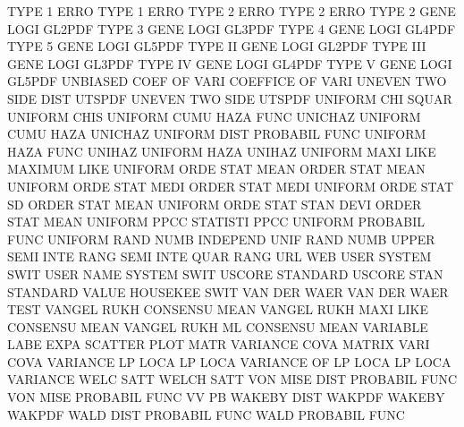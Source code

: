 TYPE     1    ERRO                      TYPE     1    ERRO
TYPE     2    ERRO                      TYPE     2    ERRO
TYPE     2    GENE LOGI                 GL2PDF
TYPE     3    GENE LOGI                 GL3PDF
TYPE     4    GENE LOGI                 GL4PDF
TYPE     5    GENE LOGI                 GL5PDF
TYPE     II   GENE LOGI                 GL2PDF
TYPE     III  GENE LOGI                 GL3PDF
TYPE     IV   GENE LOGI                 GL4PDF
TYPE     V    GENE LOGI                 GL5PDF
UNBIASED COEF OF   VARI                 COEFFICE OF   VARI
UNEVEN   TWO  SIDE DIST                 UTSPDF
UNEVEN   TWO  SIDE                      UTSPDF
UNIFORM  CHI  SQUAR                     UNIFORM  CHIS
UNIFORM  CUMU HAZA FUNC                 UNICHAZ
UNIFORM  CUMU HAZA                      UNICHAZ
UNIFORM  DIST                           PROBABIL FUNC
UNIFORM  HAZA FUNC                      UNIHAZ
UNIFORM  HAZA                           UNIHAZ
UNIFORM  MAXI LIKE                      MAXIMUM  LIKE
UNIFORM  ORDE STAT MEAN                 ORDER    STAT MEAN
UNIFORM  ORDE STAT MEDI                 ORDER    STAT MEDI
UNIFORM  ORDE STAT SD                   ORDER    STAT MEAN
UNIFORM  ORDE STAT STAN DEVI            ORDER    STAT MEAN
UNIFORM  PPCC                           STATISTI PPCC
UNIFORM                                 PROBABIL FUNC
UNIFORM  RAND NUMB                      INDEPEND UNIF RAND NUMB
UPPER    SEMI INTE RANG                 SEMI     INTE QUAR RANG
URL                                     WEB
USER                                    SYSTEM   SWIT
USER     NAME                           SYSTEM   SWIT
USCORE                                  STANDARD
USCORE   STAN                           STANDARD
VALUE                                   HOUSEKEE SWIT
VAN      DER  WAER                      VAN      DER  WAER TEST
VANGEL   RUKH                           CONSENSU MEAN
VANGEL   RUKH MAXI LIKE                 CONSENSU MEAN
VANGEL   RUKH ML                        CONSENSU MEAN
VARIABLE LABE EXPA                      SCATTER  PLOT MATR
VARIANCE COVA                           MATRIX   VARI COVA
VARIANCE LP   LOCA                      LP       LOCA
VARIANCE OF   LP   LOCA                 LP       LOCA
VARIANCE WELC SATT                      WELCH    SATT
VON      MISE DIST                      PROBABIL FUNC
VON      MISE                           PROBABIL FUNC
VV                                      PB
WAKEBY   DIST                           WAKPDF
WAKEBY                                  WAKPDF
WALD     DIST                           PROBABIL FUNC
WALD                                    PROBABIL FUNC
